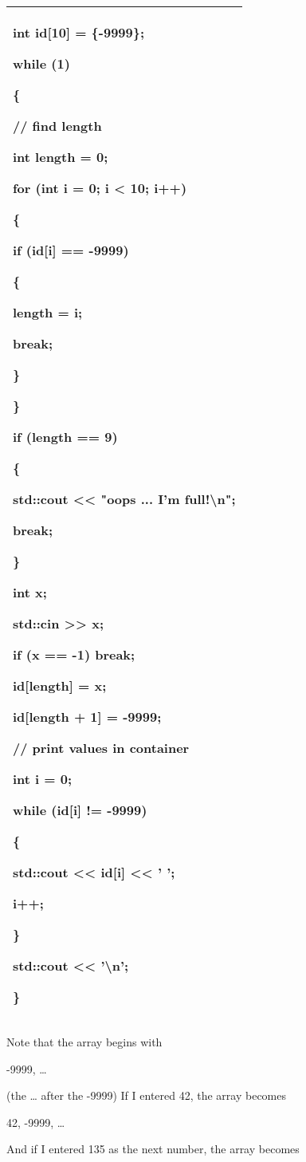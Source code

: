 \documentclass[
]{article}
\begin{document}
\begin{longtable}[]{@{}l@{}}
\toprule
\endhead
\begin{minipage}[t]{0.97\columnwidth}\raggedright
int id{[}10{]} = \{-9999\};

while (1)

\{

// find length

int length = 0;

for (int i = 0; i \textless{} 10; i++)

\{

if (id{[}i{]} == -9999)

\{

length = i;

break;

\}

\}

if (length == 9)

\{

std::cout \textless\textless{} "oops ... I'm full!\textbackslash n";

break;

\}

int x;

std::cin \textgreater\textgreater{} x;

if (x == -1) break;

id{[}length{]} = x;

id{[}length + 1{]} = -9999;

// print values in container

int i = 0;

while (id{[}i{]} != -9999)

\{

std::cout \textless\textless{} id{[}i{]} \textless\textless{} ' ';

i++;

\}

std::cout \textless\textless{} '\textbackslash n';

\}\strut
\end{minipage}\tabularnewline
\bottomrule
\end{longtable}

Note that the array begins with

-9999, \ldots{}

(the \ldots{} after the -9999) If I entered 42, the array becomes

42, -9999, \ldots{}

And if I entered 135 as the next number, the array becomes
\end{document}

